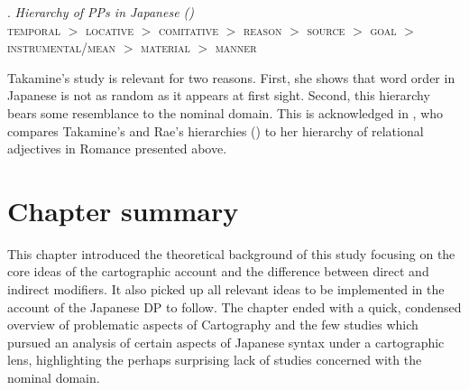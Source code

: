 \ex. \emph {Hierarchy of PPs in Japanese (\citealt[94]{takamine:2010:hierarchy})}\\
\textsc{temporal} $>$ \textsc{locative} $>$ \textsc{comitative} $>$ \textsc{reason} $>$ \textsc{source} $>$ \textsc{goal} $>$ \textsc{instrumental}/\textsc{mean} $>$ \textsc{material} $>$ \textsc{manner}

Takamine’s study is relevant for two reasons. First, she shows that word order in Japanese is not as random as it appears at first sight. Second, this hierarchy bears some resemblance to the nominal domain. This is acknowledged in \citet{bortolotto:2016:RA}, who compares Takamine's and Rae's hierarchies (\citeyear{rae:2010:ordering}) to her hierarchy of relational adjectives in Romance presented above.

\section{Chapter summary}

This chapter introduced the theoretical background of this study focusing on the core ideas of the cartographic account and the difference between direct and indirect modifiers. It also picked up all relevant ideas to be implemented in the account of the Japanese DP to follow. The chapter ended with a quick, condensed overview of problematic aspects of Cartography and the few studies which pursued an analysis of certain aspects of Japanese syntax under a cartographic lens, highlighting the perhaps surprising lack of studies concerned with the nominal domain.

